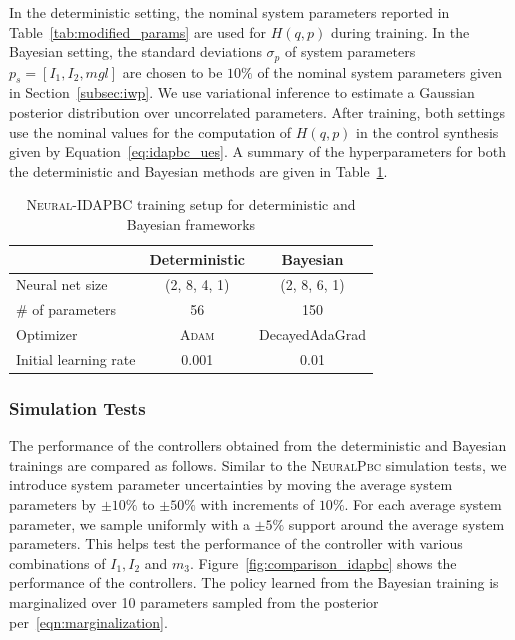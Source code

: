 In the deterministic setting, the nominal system parameters reported in
Table~\ref{tab:modified_params} are used for $H(q,p)$ during training. 
%
In the Bayesian setting, the standard deviations $\sigma_{p}$ of system
parameters $p_s = [I_1, I_2, mgl]$ are chosen to be $10\%$ of the nominal system
parameters given in Section~\ref{subsec:iwp}.
%
We use variational inference to estimate a Gaussian posterior distribution
over uncorrelated parameters.
%
After training, both settings use the nominal values for the computation of
$H(q,p)$ in the control synthesis given by Equation~\eqref{eq:idapbc_ues}.
%
A summary of the hyperparameters for both the deterministic and Bayesian methods
are given in Table~\ref{tab:training_setup_idapbc}. 
\begin{table}[t]
    \centering
    \caption{\textsc{Neural-IDAPBC} training setup for deterministic and Bayesian frameworks}
    \begin{tabular}{lcc}
    \toprule
    & Deterministic & Bayesian \\
    \midrule
        Neural net size & (2, 8, 4, 1) & (2, 8, 6, 1)\\
        \# of parameters &  56  & 150\\
        Optimizer & \textsc{Adam} & DecayedAdaGrad\\
        Initial learning rate & 0.001 & 0.01\\
    \bottomrule
    \end{tabular}
    \label{tab:training_setup_idapbc}
\end{table}

\subsubsection{Simulation Tests} 
The performance of the controllers obtained from the deterministic and Bayesian
trainings are compared as follows.
%
%
Similar to the \textsc{NeuralPbc} simulation tests, we introduce system
parameter uncertainties by moving the average system parameters by $\pm
10\%$ to $\pm 50\%$ with increments of $10\%$. 
%
For each average system parameter, we sample uniformly with a $\pm 5\%$ support
around the average system parameters. 
%
This helps test the performance of the controller with various combinations of
$I_1, I_2$ and $m_3$.
%
%
%
Figure~\ref{fig:comparison_idapbc} shows the performance of the controllers.
The policy learned from the Bayesian training is marginalized over 10
parameters sampled from the posterior per~\eqref{eqn:marginalization}.

